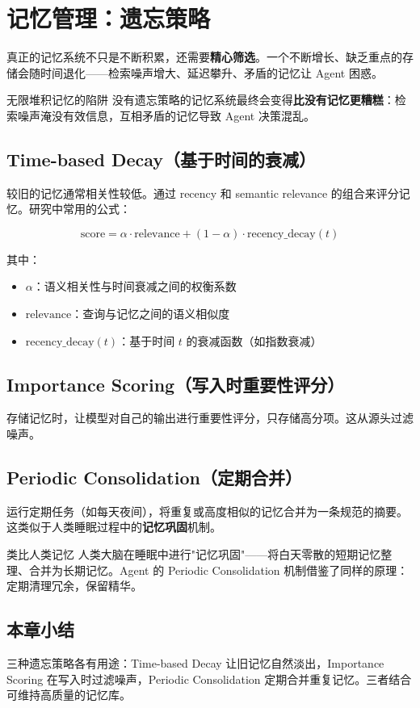 \section{记忆管理：遗忘策略}

真正的记忆系统不只是不断积累，还需要\textbf{精心筛选}。一个不断增长、缺乏重点的存储会随时间退化——检索噪声增大、延迟攀升、矛盾的记忆让 Agent 困惑。

\begin{warningbox}{无限堆积记忆的陷阱}
没有遗忘策略的记忆系统最终会变得\textbf{比没有记忆更糟糕}：检索噪声淹没有效信息，互相矛盾的记忆导致 Agent 决策混乱。
\end{warningbox}

\subsection{Time-based Decay（基于时间的衰减）}

较旧的记忆通常相关性较低。通过 recency 和 semantic relevance 的组合来评分记忆。研究中常用的公式：

$$
\text{score} = \alpha \cdot \text{relevance} + (1 - \alpha) \cdot \text{recency\_decay}(t)
$$

其中：
\begin{itemize}[leftmargin=2em]
    \item $\alpha$：语义相关性与时间衰减之间的权衡系数
    \item $\text{relevance}$：查询与记忆之间的语义相似度
    \item $\text{recency\_decay}(t)$：基于时间 $t$ 的衰减函数（如指数衰减）
\end{itemize}

\subsection{Importance Scoring（写入时重要性评分）}

存储记忆时，让模型对自己的输出进行重要性评分，只存储高分项。这从源头过滤噪声。

\subsection{Periodic Consolidation（定期合并）}

运行定期任务（如每天夜间），将重复或高度相似的记忆合并为一条规范的摘要。这类似于人类睡眠过程中的\textbf{记忆巩固}机制。

\begin{knowledgebox}{类比人类记忆}
人类大脑在睡眠中进行"记忆巩固"——将白天零散的短期记忆整理、合并为长期记忆。Agent 的 Periodic Consolidation 机制借鉴了同样的原理：定期清理冗余，保留精华。
\end{knowledgebox}

\subsection{本章小结}

三种遗忘策略各有用途：Time-based Decay 让旧记忆自然淡出，Importance Scoring 在写入时过滤噪声，Periodic Consolidation 定期合并重复记忆。三者结合可维持高质量的记忆库。

